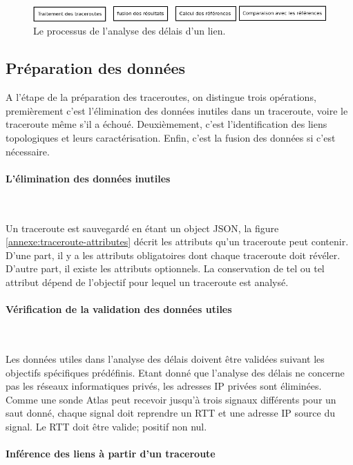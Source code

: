 \begin{figure}[H]
	\centering
	\includegraphics[width=1\linewidth]{illustrations/process-detection}
	\caption{Le processus de l'analyse des délais d'un lien.}
	\label{fig:process-detection}
\end{figure}

\subsection{Préparation des données}
 A l'étape de la préparation des traceroutes, on distingue trois opérations, premièrement c'est l'élimination des données inutiles dans un traceroute, voire le traceroute même s'il a échoué. Deuxièmement, c'est l'identification des liens topologiques et leurs caractérisation. Enfin, c'est la fusion des données si c'est nécessaire. 
 
\paragraph{L'élimination des données inutiles}~

  Un traceroute est sauvegardé en étant un object JSON, la figure \ref{annexe:traceroute-attributes} décrit les attributs qu'un traceroute peut contenir. D'une part, il y a les attributs obligatoires dont chaque traceroute doit révéler. D'autre part, il existe les attributs optionnels.  La conservation de tel ou tel attribut dépend de l'objectif pour lequel un traceroute est analysé.  

\paragraph{Vérification de la validation des données utiles}~

 Les données utiles dans l'analyse des délais doivent être validées suivant les objectifs spécifiques prédéfinis. Etant donné que l'analyse des délais ne concerne pas les réseaux informatiques privés, les adresses IP privées sont éliminées. Comme une sonde Atlas peut recevoir jusqu'à trois signaux différents pour un saut donné, chaque signal doit reprendre un RTT et une adresse IP source du signal. Le RTT doit être valide; positif non nul.
 
 
 \paragraph{Inférence des liens à partir d'un traceroute } ~
 
